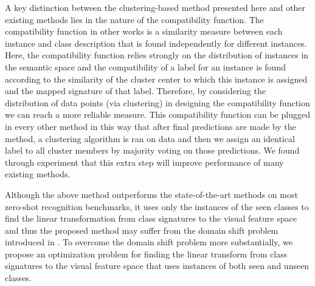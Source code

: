 \documentclass[10pt,twocolumn,letterpaper]{article}
\begin{document}


A key distinction between the clustering-based method presented here and other existing methods lies in the nature of the compatibility function. The compatibility function in
other works is a similarity measure between each instance and class description that is found independently for different instances.
 Here, the compatibility function relies strongly on the distribution of instances in the semantic space and the compatibility of a label for an instance is found according to the similarity of the cluster center to which this instance is assigned and the mapped signature of that label. Therefore, by considering the distribution of data points (via clustering)
  in designing the compatibility function we can reach a more reliable measure.
  This compatibility function can be plugged in every other method in this way that after final predictions are made by the method,
a clustering algorithm is ran on data and then we assign an identical label to all cluster
members by majority voting on those predictions. We found through experiment that this extra step will improve performance of
many existing methods.

Although the above method outperforms the state-of-the-art methods on most zero-shot recognition benchmarks, it uses only the instances of the seen classes to find the linear transformation from class signatures to the visual feature space and thus the proposed method may suffer from the domain shift problem introduced in \cite{eccv14}.
To overcome the domain shift problem more substantially, we propose an optimization problem for finding the linear transform from class signatures to the visual feature space that uses instances of both seen and unseen classes.
\end{document}
